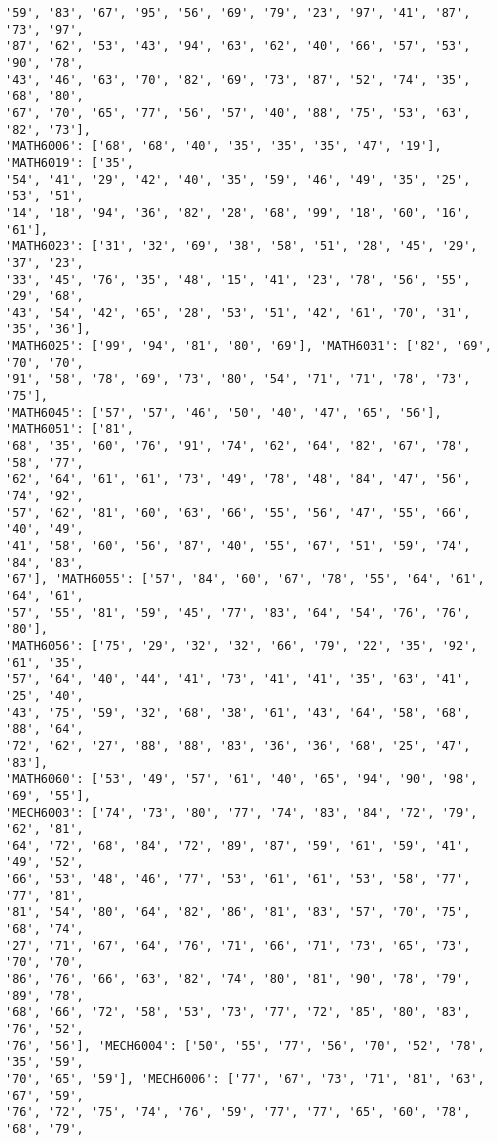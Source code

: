 \documentclass[11pt]{article}
\begin{document}
\begin{Verbatim}[commandchars=\\\{\}]
'59', '83', '67', '95', '56', '69', '79', '23', '97', '41', '87', '73', '97',
'87', '62', '53', '43', '94', '63', '62', '40', '66', '57', '53', '90', '78',
'43', '46', '63', '70', '82', '69', '73', '87', '52', '74', '35', '68', '80',
'67', '70', '65', '77', '56', '57', '40', '88', '75', '53', '63', '82', '73'],
'MATH6006': ['68', '68', '40', '35', '35', '35', '47', '19'], 'MATH6019': ['35',
'54', '41', '29', '42', '40', '35', '59', '46', '49', '35', '25', '53', '51',
'14', '18', '94', '36', '82', '28', '68', '99', '18', '60', '16', '61'],
'MATH6023': ['31', '32', '69', '38', '58', '51', '28', '45', '29', '37', '23',
'33', '45', '76', '35', '48', '15', '41', '23', '78', '56', '55', '29', '68',
'43', '54', '42', '65', '28', '53', '51', '42', '61', '70', '31', '35', '36'],
'MATH6025': ['99', '94', '81', '80', '69'], 'MATH6031': ['82', '69', '70', '70',
'91', '58', '78', '69', '73', '80', '54', '71', '71', '78', '73', '75'],
'MATH6045': ['57', '57', '46', '50', '40', '47', '65', '56'], 'MATH6051': ['81',
'68', '35', '60', '76', '91', '74', '62', '64', '82', '67', '78', '58', '77',
'62', '64', '61', '61', '73', '49', '78', '48', '84', '47', '56', '74', '92',
'57', '62', '81', '60', '63', '66', '55', '56', '47', '55', '66', '40', '49',
'41', '58', '60', '56', '87', '40', '55', '67', '51', '59', '74', '84', '83',
'67'], 'MATH6055': ['57', '84', '60', '67', '78', '55', '64', '61', '64', '61',
'57', '55', '81', '59', '45', '77', '83', '64', '54', '76', '76', '80'],
'MATH6056': ['75', '29', '32', '32', '66', '79', '22', '35', '92', '61', '35',
'57', '64', '40', '44', '41', '73', '41', '41', '35', '63', '41', '25', '40',
'43', '75', '59', '32', '68', '38', '61', '43', '64', '58', '68', '88', '64',
'72', '62', '27', '88', '88', '83', '36', '36', '68', '25', '47', '83'],
'MATH6060': ['53', '49', '57', '61', '40', '65', '94', '90', '98', '69', '55'],
'MECH6003': ['74', '73', '80', '77', '74', '83', '84', '72', '79', '62', '81',
'64', '72', '68', '84', '72', '89', '87', '59', '61', '59', '41', '49', '52',
'66', '53', '48', '46', '77', '53', '61', '61', '53', '58', '77', '77', '81',
'81', '54', '80', '64', '82', '86', '81', '83', '57', '70', '75', '68', '74',
'27', '71', '67', '64', '76', '71', '66', '71', '73', '65', '73', '70', '70',
'86', '76', '66', '63', '82', '74', '80', '81', '90', '78', '79', '89', '78',
'68', '66', '72', '58', '53', '73', '77', '72', '85', '80', '83', '76', '52',
'76', '56'], 'MECH6004': ['50', '55', '77', '56', '70', '52', '78', '35', '59',
'70', '65', '59'], 'MECH6006': ['77', '67', '73', '71', '81', '63', '67', '59',
'76', '72', '75', '74', '76', '59', '77', '77', '65', '60', '78', '68', '79',

\end{Verbatim}
\end{document}
